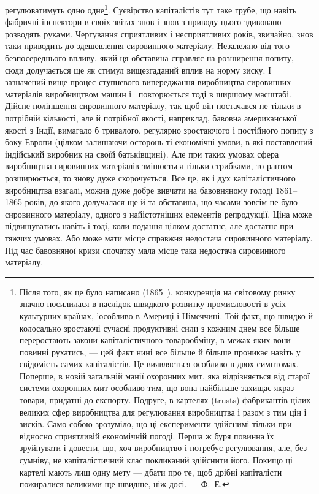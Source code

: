 регулюватимуть одно одне\footnote{
Після того, як це було написано (1865~), конкуренція на світовому ринку
значно посилилася в наслідок швидкого розвитку промисловості в усіх культурних
країнах, 'особливо в Америці і Німеччині. Той факт, що швидко й колосально
зростаючі сучасні продуктивні сили з кожним днем все більше переростають
закони капіталістичного товарообміну, в межах яких вони повинні
рухатись, — цей факт нині все більше й більше проникає навіть у свідомість
самих капіталістів. Це виявляється особливо в двох симптомах. Поперше, в новій
загальній манії охоронних мит, яка відрізняється від старої системи охоронних
мит особливо тим, що вона найбільше захищає якраз товари, придатні до
експорту. Подруге, в картелях (trusts) фабрикантів цілих великих сфер виробництва
для регулювання виробництва і разом з тим цін і зисків. Само собою
зрозуміло, що ці експерименти здійснимі тільки при відносно сприятливій
економічній погоді. Перша ж буря повинна їх зруйнувати і довести, що, хоч
виробництво і потребує регулювання, але, без сумніву, не капіталістичний клас
покликаний здійснити його. Покищо ці картелі мають лиш одну мету —
дбати про те, щоб дрібні капіталісти пожиралися великими ще швидше, ніж
досі. — Ф.~Е.
}. Суєвірство капіталістів тут таке
грубе, що навіть фабричні інспектори в своїх звітах знов і знов
з приводу цього здивовано розводять руками. Чергування сприятливих
і несприятливих років, звичайно, знов таки приводить до
здешевлення сировинного матеріалу. Незалежно від того безпосереднього
впливу, який ця обставина справляє на розширення
попиту, сюди долучається ще як стимул вищезгаданий
вплив на норму зиску. І зазначений вище процес ступневого
випереджання виробництва сировинних матеріалів виробництвом
машин і~ повторюється тоді в ширшому масштабі. Дійсне
поліпшення сировинного матеріалу, так щоб він постачався не
тільки в потрібній кількості, але й потрібної якості, наприклад,
бавовна американської якості з Індії, вимагало б тривалого, регулярно
зростаючого і постійного попиту з боку Европи (цілком
залишаючи осторонь ті економічні умови, в які поставлений індійський
виробник на своїй батьківщині). Але при таких умовах
сфера виробництва сировинних матеріалів змінюється тільки
стрибками, то раптом розширюється, то знову дуже скорочується.
Все це, як і дух капіталістичного виробництва взагалі, можна
дуже добре вивчати на бавовняному голоді 1861--1865 років, до
якого долучалася ще й та обставина, що часами зовсім не було
сировинного матеріалу, одного з найістотніших елементів репродукції.
Ціна може підвищуватись навіть і тоді, коли подання
цілком достатнє, але достатнє при тяжчих умовах. Або може
мати місце справжня недостача сировинного матеріалу. Під час
бавовняної кризи спочатку мала місце така недостача сировинного
матеріалу.

